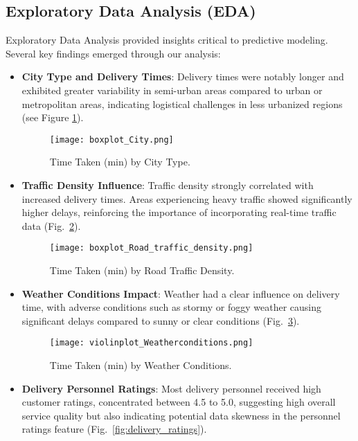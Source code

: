 \documentclass[10pt,twocolumn,letterpaper]{article}
\begin{document}
\subsection{Exploratory Data Analysis (EDA)}
Exploratory Data Analysis provided insights critical to predictive modeling. Several key findings emerged through our analysis:

\begin{itemize}
    \item \textbf{City Type and Delivery Times}: Delivery times were notably longer and exhibited greater variability in semi-urban areas compared to urban or metropolitan areas, indicating logistical challenges in less urbanized regions (see Figure \ref{fig:city_type}).

    \begin{figure}[ht]
        \centering
        \texttt{[image: boxplot\_City.png]}
        \caption{Time Taken (min) by City Type.}
        \label{fig:city_type}
    \end{figure}

    \item \textbf{Traffic Density Influence}: Traffic density strongly correlated with increased delivery times. Areas experiencing heavy traffic showed significantly higher delays, reinforcing the importance of incorporating real-time traffic data (Fig.~\ref{fig:traffic_density}).

    \begin{figure}[ht]
        \centering
        \texttt{[image: boxplot\_Road\_traffic\_density.png]}
        \caption{Time Taken (min) by Road Traffic Density.}
        \label{fig:traffic_density}
    \end{figure}

    \item \textbf{Weather Conditions Impact}: Weather had a clear influence on delivery time, with adverse conditions such as stormy or foggy weather causing significant delays compared to sunny or clear conditions (Fig.~\ref{fig:weather_conditions}).

    \begin{figure}[ht]
        \centering
        \texttt{[image: violinplot\_Weatherconditions.png]}
        \caption{Time Taken (min) by Weather Conditions.}
        \label{fig:weather_conditions}
    \end{figure}

    \item \textbf{Delivery Personnel Ratings}: Most delivery personnel received high customer ratings, concentrated between 4.5 to 5.0, suggesting high overall service quality but also indicating potential data skewness in the personnel ratings feature (Fig.~\ref{fig:delivery_ratings}).


\end{itemize}
\end{document}
